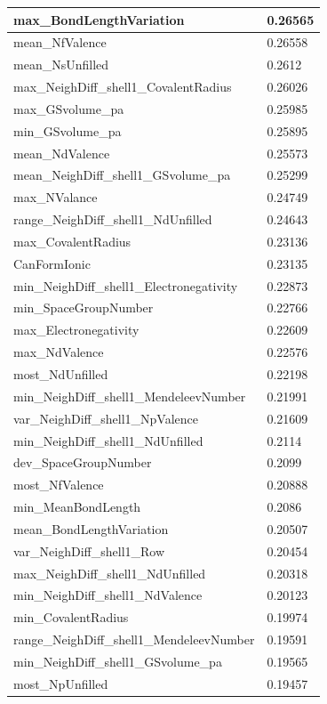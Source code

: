 \begin{longtable}{|l|l|}
max\_BondLengthVariation & 0.26565 \\ \hline
mean\_NfValence & 0.26558 \\ \hline
mean\_NsUnfilled & 0.2612 \\ \hline
max\_NeighDiff\_shell1\_CovalentRadius & 0.26026 \\ \hline
max\_GSvolume\_pa & 0.25985 \\ \hline
min\_GSvolume\_pa & 0.25895 \\ \hline
mean\_NdValence & 0.25573 \\ \hline
mean\_NeighDiff\_shell1\_GSvolume\_pa & 0.25299 \\ \hline
max\_NValance & 0.24749 \\ \hline
range\_NeighDiff\_shell1\_NdUnfilled & 0.24643 \\ \hline
max\_CovalentRadius & 0.23136 \\ \hline
CanFormIonic & 0.23135 \\ \hline
min\_NeighDiff\_shell1\_Electronegativity & 0.22873 \\ \hline
min\_SpaceGroupNumber & 0.22766 \\ \hline
max\_Electronegativity & 0.22609 \\ \hline
max\_NdValence & 0.22576 \\ \hline
most\_NdUnfilled & 0.22198 \\ \hline
min\_NeighDiff\_shell1\_MendeleevNumber & 0.21991 \\ \hline
var\_NeighDiff\_shell1\_NpValence & 0.21609 \\ \hline
min\_NeighDiff\_shell1\_NdUnfilled & 0.2114 \\ \hline
dev\_SpaceGroupNumber & 0.2099 \\ \hline
most\_NfValence & 0.20888 \\ \hline
min\_MeanBondLength & 0.2086 \\ \hline
mean\_BondLengthVariation & 0.20507 \\ \hline
var\_NeighDiff\_shell1\_Row & 0.20454 \\ \hline
max\_NeighDiff\_shell1\_NdUnfilled & 0.20318 \\ \hline
min\_NeighDiff\_shell1\_NdValence & 0.20123 \\ \hline
min\_CovalentRadius & 0.19974 \\ \hline
range\_NeighDiff\_shell1\_MendeleevNumber & 0.19591 \\ \hline
min\_NeighDiff\_shell1\_GSvolume\_pa & 0.19565 \\ \hline
most\_NpUnfilled & 0.19457 \\ \hline

\end{longtable}
